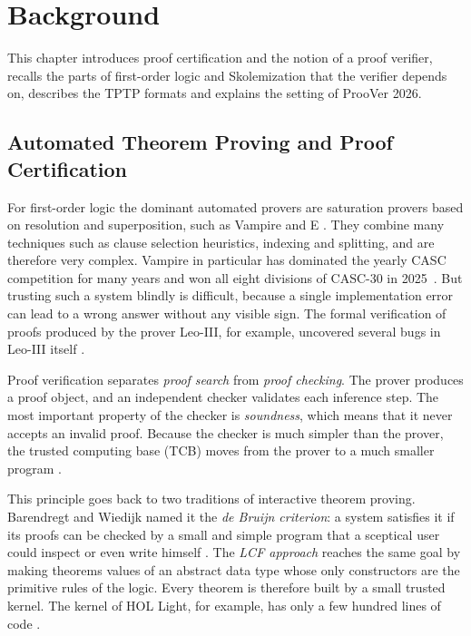 \section{Background}
\label{sec:background}

This chapter introduces proof certification and the notion of a proof verifier, recalls the parts of first-order logic and Skolemization that the verifier depends on, describes the TPTP formats and explains the setting of ProoVer 2026.

\subsection{Automated Theorem Proving and Proof Certification}
\label{subsec:atp-certification}

For first-order logic the dominant automated provers are saturation provers based on resolution \citep{Robinson1965} and superposition, such as Vampire \citep{RiazanovVoronkov2002} and E \citep{SchulzCV2019}.
They combine many techniques such as clause selection heuristics, indexing and splitting, and are therefore very complex.
Vampire in particular has dominated the yearly CASC competition for many years and won all eight divisions of CASC-30 in 2025~\citep{Sut16,CASC30}.
But trusting such a system blindly is difficult, because a single implementation error can lead to a wrong answer without any visible sign.
The formal verification of proofs produced by the prover Leo-III, for example, uncovered several bugs in Leo-III itself \citep{taprogge2026formal}.

Proof verification separates \emph{proof search} from \emph{proof checking}.
The prover produces a proof object, and an independent checker validates each inference step.
The most important property of the checker is \emph{soundness}, which means that it never accepts an invalid proof.
Because the checker is much simpler than the prover, the trusted computing base (TCB) moves from the prover to a much smaller program \citep{Pollack1998,chihani2013foundational}.

This principle goes back to two traditions of interactive theorem proving.
Barendregt and Wiedijk named it the \emph{de Bruijn criterion}: a system satisfies it if its proofs can be checked by a small and simple program that a sceptical user could inspect or even write himself \citep{BarendregtWiedijk2005}.
The \emph{LCF approach} \citep{GordonMilnerWadsworth1979} reaches the same goal by making theorems values of an abstract data type whose only constructors are the primitive rules of the logic. Every theorem is therefore built by a small trusted kernel. The kernel of HOL Light, for example, has only a few hundred lines of code \citep{Harrison2009HOLLight}.

